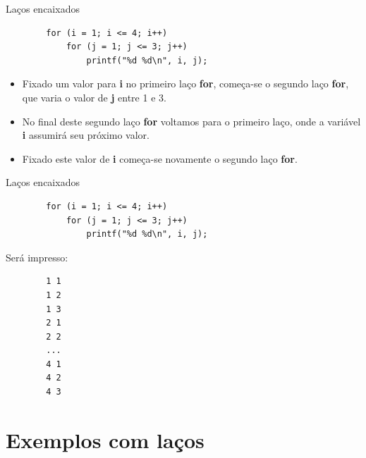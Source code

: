 \documentclass[handout]{beamer}
\begin{document}
\begin{frame}[fragile]{Laços encaixados}

    \begin{verbatim}
        for (i = 1; i <= 4; i++)
            for (j = 1; j <= 3; j++)
                printf("%d %d\n", i, j);
    \end{verbatim}

    \begin{itemize}
        \item Fixado um valor para {\bf i} no primeiro laço {\bf for}, começa-se o segundo laço {\bf for}, que varia o valor de {\bf j} entre 1 e 3.
        \item No final deste segundo laço {\bf for} voltamos para o primeiro laço, onde a variável {\bf i} assumirá seu próximo valor.
        \item Fixado este valor de {\bf i} começa-se novamente o segundo laço {\bf for}.
    \end{itemize}
\end{frame}

\begin{frame}[fragile]{Laços encaixados}

    \begin{verbatim}
        for (i = 1; i <= 4; i++)
            for (j = 1; j <= 3; j++)
                printf("%d %d\n", i, j);
    \end{verbatim}

    Será impresso:
    \begin{verbatim}
        1 1
        1 2
        1 3
        2 1
        2 2
        ...
        4 1
        4 2
        4 3
    \end{verbatim}
\end{frame}

\section{Exemplos com laços}

\end{document}

